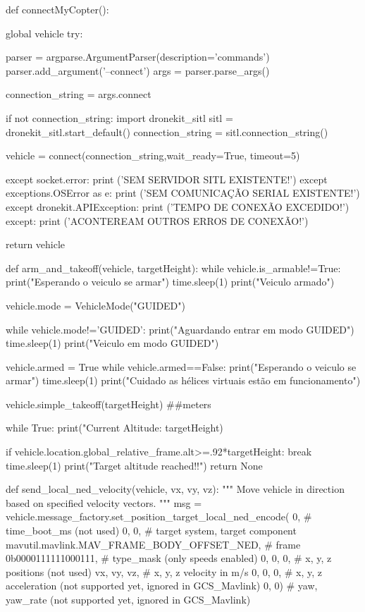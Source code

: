 \begin{apendicesenv}
\begin{python_}
def connectMyCopter():

	global vehicle
	try:
	
		parser = argparse.ArgumentParser(description='commands')
		parser.add_argument('--connect')
		args = parser.parse_args()
		
		connection_string = args.connect
		
		if not connection_string:
			import dronekit_sitl
			sitl = dronekit_sitl.start_default()
			connection_string = sitl.connection_string()
		
		vehicle = connect(connection_string,wait_ready=True, timeout=5)
	
	except socket.error:
		print ('SEM SERVIDOR SITL EXISTENTE!')
	except exceptions.OSError as e:
		print ('SEM COMUNICAÇÃO SERIAL EXISTENTE!')
	except dronekit.APIException:
		print ('TEMPO DE CONEXÃO EXCEDIDO!')
	except:
		print ('ACONTEREAM OUTROS ERROS DE CONEXÃO!')
	
	return vehicle

def arm_and_takeoff(vehicle, targetHeight):
	while vehicle.is_armable!=True:
		print("Esperando o veiculo se armar")
		time.sleep(1)
	print("Veiculo armado")
	
	vehicle.mode = VehicleMode("GUIDED")
	
	while vehicle.mode!='GUIDED':
		print("Aguardando entrar em modo GUIDED")
		time.sleep(1)
	print("Veiculo em modo GUIDED")
	
	vehicle.armed = True
	while vehicle.armed==False:
		print("Esperando o veiculo se armar")
		time.sleep(1)
	print("Cuidado as hélices virtuais estão em funcionamento")
	
	vehicle.simple_takeoff(targetHeight) ##meters
	
	
	while True:
		print("Current Altitude: %
		targetHeight)
		
		if vehicle.location.global_relative_frame.alt>=.92*targetHeight:
		break
		time.sleep(1)
	print("Target altitude reached!!")
	return None

def send_local_ned_velocity(vehicle, vx, vy, vz):
	"""
	Move vehicle in direction based on specified velocity vectors.
	"""
	msg = vehicle.message_factory.set_position_target_local_ned_encode(
		0,       # time_boot_ms (not used)
		0, 0,    # target system, target component
		mavutil.mavlink.MAV_FRAME_BODY_OFFSET_NED, # frame
		0b0000111111000111, # type_mask (only speeds enabled)
		0, 0, 0, # x, y, z positions (not used)
		vx, vy, vz, # x, y, z velocity in m/s
		0, 0, 0, # x, y, z acceleration (not supported yet, ignored in GCS_Mavlink)
		0, 0)    # yaw, yaw_rate (not supported yet, ignored in GCS_Mavlink)
	

\end{python_}
\end{apendicesenv}
